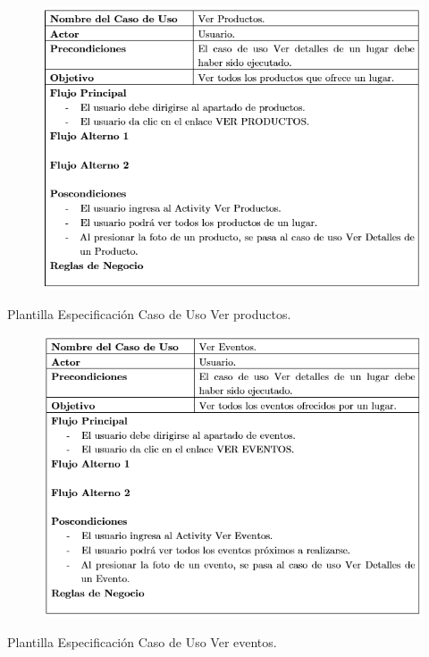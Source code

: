 \documentclass[12pt,letterpaper,openany]{book}
\begin{document}
\begin{table}[H]
\begin{center}
\begin{figure}[H]
\begin{center}
\includegraphics[width=13cm]{./imagenes/PCU/ver_productos}
\end{center}
\end{figure}
\end{center}
\caption{Plantilla Especificación Caso de Uso Ver productos.}
\end{table}

\begin{table}[H]
\begin{center}
\begin{figure}[H]
\begin{center}
\includegraphics[width=13cm]{./imagenes/PCU/ver_eventos}
\end{center}
\end{figure}
\end{center}
\caption{Plantilla Especificación Caso de Uso Ver eventos.}
\end{table}
\end{document}
